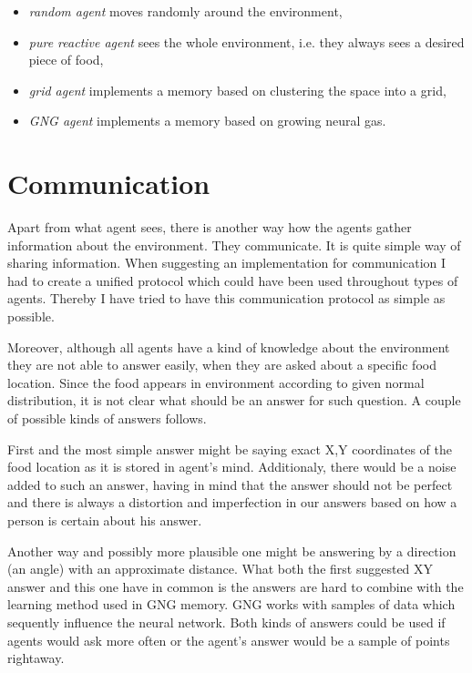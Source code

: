 \begin{itemize}
\item \emph{random agent} moves randomly around the environment,
\item \emph{pure reactive agent} sees the whole environment, i.e. they always sees a desired piece of food, 
\item \emph{grid agent} implements a memory based on clustering the space into a grid,
\item \emph{GNG agent} implements a memory based on growing neural gas.
\end{itemize}

\section{Communication}

Apart from what agent sees, there is another way how the agents gather information about the environment. They communicate. It is quite simple way of sharing information. When suggesting an implementation for communication I had to create a unified protocol which could have been used throughout types of agents. Thereby I have tried to have this communication protocol as simple as possible.

Moreover, although all agents have a kind of knowledge about the environment they are not able to answer easily, when they are asked about a specific food location. Since the food appears in environment according to given normal distribution, it is not clear what should be an answer for such question. A couple of possible kinds of answers follows. 

First and the most simple answer might be saying exact X,Y coordinates of the food location as it is stored in agent's mind. Additionaly, there would be a noise added to such an answer, having in mind that the answer should not be perfect and there is always a distortion and imperfection in our answers based on how a person is certain about his answer.
                                              
Another way and possibly more plausible one might be answering by a direction (an angle) with an approximate distance. What both the first suggested XY answer and this one have in common is the answers are hard to combine with the learning method used in GNG memory. GNG works with samples of data which sequently influence the neural network. Both kinds of answers could be used if agents would ask more often or the agent's answer would be a sample of points rightaway.

